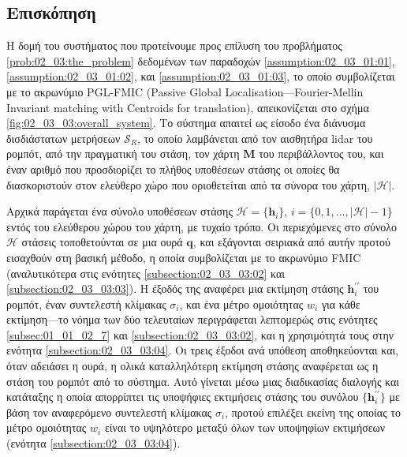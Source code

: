 \subsection{Επισκόπηση}
\label{subsection:02_03_03:01}

Η δομή του συστήματος που προτείνουμε προς επίλυση του προβλήματος
\ref{prob:02_03:the_problem} δεδομένων των παραδοχών
\ref{assumption:02_03_01:01}, \ref{assumption:02_03_01:02}, και
\ref{assumption:02_03_01:03}, το οποίο συμβολίζεται με το ακρωνύμιο PGL-FMIC
(Passive Global Localisation---Fourier-Mellin Invariant matching with Centroids
for translation), απεικονίζεται στο σχήμα \ref{fig:02_03_03:overall_system}. Το
σύστημα απαιτεί ως είσοδο ένα διάνυσμα δισδιάστατων μετρήσεων $\mathcal{S}_R$,
το οποίο λαμβάνεται από τον αισθητήρα lidar του ρομπότ, από την πραγματική του
στάση, τον χάρτη $\bm{M}$ του περιβάλλοντος του, και έναν αριθμό που
προσδιορίζει το πλήθος υποθέσεων στάσης οι οποίες θα διασκοριστούν στον
ελεύθερο χώρο που οριοθετείται από τα σύνορα του χάρτη, $|\mathcal{H}|$.

Αρχικά παράγεται ένα σύνολο υποθέσεων στάσης $\mathcal{H} = \{\bm{h}_i\}$, $i =
\{0, 1, \dots, |\mathcal{H}|-1\}$ εντός του ελεύθερου χώρου του χάρτη, με
τυχαίο τρόπο. Οι περιεχόμενες στο σύνολο $\mathcal{H}$ στάσεις τοποθετούνται σε
μια ουρά $\bm{q}$, και εξάγονται σειριακά από αυτήν προτού εισαχθούν στη βασική
μέθοδο, η οποία συμβολίζεται με το ακρωνύμιο FMIC (αναλυτικότερα στις ενότητες
\ref{subsection:02_03_03:02} και \ref{subsection:02_03_03:03}). Η έξοδός της
αναφέρει μια εκτίμηση στάσης $\bm{h}_i^{\prime\prime}$ του ρομπότ, έναν
συντελεστή κλίμακας $\sigma_i$, και ένα μέτρο ομοιότητας $w_i$ για κάθε
εκτίμηση---το νόημα των δύο τελευταίων περιγράφεται λεπτομερώς στις ενότητες
\ref{subsec:01_01_02_7} και \ref{subsection:02_03_03:02}, και η χρησιμότητά
τους στην ενότητα \ref{subsection:02_03_03:04}. Οι τρεις έξοδοι ανά υπόθεση
αποθηκεύονται και, όταν αδειάσει η ουρά, η ολικά καταλληλότερη εκτίμηση στάσης
αναφέρεται ως η στάση του ρομπότ από το σύστημα. Αυτό γίνεται μέσω μιας
διαδικασίας διαλογής και κατάταξης η οποία απορρίπτει τις υποψήφιες εκτιμήσεις
στάσης του συνόλου $\{\bm{h}_i^{\prime\prime}\}$ με βάση τον αναφερόμενο
συντελεστή κλίμακας $\sigma_i$, προτού επιλέξει εκείνη της οποίας το μέτρο
ομοιότητας $w_i$ είναι το υψηλότερο μεταξύ όλων των υποψηφίων εκτιμήσεων
(ενότητα \ref{subsection:02_03_03:04}).


